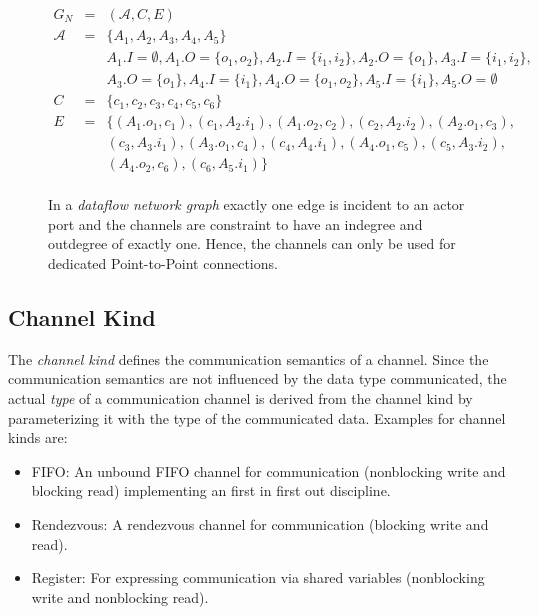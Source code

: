\begin{figure}
\centering

\begin{displaymath}
\begin{array}{rcl}
  G_N & = & (\mathcal{A},C,E) \\
  \mathcal{A} & = & \{A_1,A_2,A_3,A_4,A_5\} \\
      &   & A_1.I = \emptyset, A_1.O=\{o_1,o_2\}, A_2.I = \{i_1,i_2\}, A_2.O=\{o_1\},A_3.I = \{i_1,i_2\},\\
      &   & A_3.O=\{o_1\},A_4.I = \{i_1\}, A_4.O=\{o_1,o_2\}, A_5.I = \{i_1\}, A_5.O=\emptyset \\
  C   & = & \{c_1,c_2,c_3,c_4,c_5,c_6\} \\
  E   & = & \{(A_1.o_1,c_1),(c_1,A_2.i_1),(A_1.o_2,c_2),(c_2,A_2.i_2),(A_2.o_1,c_3),\\
      &   &   (c_3,A_3.i_1),(A_3.o_1,c_4),(c_4,A_4.i_1),(A_4.o_1,c_5),(c_5,A_3.i_2),\\
      &   &   (A_4.o_2,c_6),(c_6,A_5.i_1)\} \\
\end{array}
\end{displaymath}
\caption{\label{ng-dataflow} In a \emph{dataflow network graph} exactly
  one edge is incident to an actor port and the channels are
  constraint to have an indegree and outdegree of exactly one.
  Hence, the channels can only be used for dedicated
  Point-to-Point connections.}
\end{figure}

\subsection{Channel Kind}\label{channel-kind}

The \emph{channel kind} defines the communication semantics of a channel.
Since the communication semantics are not influenced by the
data type communicated, the actual \emph{type} of a communication
channel is derived from the channel kind by parameterizing it with
the type of the communicated data. Examples for channel kinds are:

\begin{itemize}
\item \label{channel-kind-fifo} FIFO:
  An unbound FIFO channel for communication
  (nonblocking write and blocking read) implementing
  an first in first out discipline.

\item \label{channel-kind-rendezvous} Rendezvous:
  A rendezvous channel for communication %
  (blocking write and read).

\item \label{channel-kind-register} Register:
  For expressing communication via shared variables
  (nonblocking write and nonblocking read).
\end{itemize}

